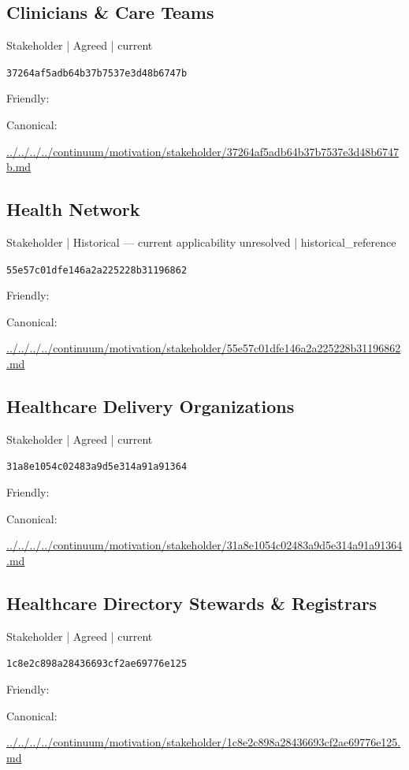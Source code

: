 \documentclass[10pt,a4paper]{article}
\begin{document}
\subsection*{Clinicians \& Care Teams}
{\small Stakeholder | Agreed | current}\par
\texttt{37264af5adb64b37b7537e3d48b6747b}\par
Friendly: \par
Canonical: \par
{\footnotesize\url{../../../../continuum/motivation/stakeholder/37264af5adb64b37b7537e3d48b6747b.md}}\par
\subsection*{Health Network}
{\small Stakeholder | Historical — current applicability unresolved | historical\_reference}\par
\texttt{55e57c01dfe146a2a225228b31196862}\par
Friendly: \par
Canonical: \par
{\footnotesize\url{../../../../continuum/motivation/stakeholder/55e57c01dfe146a2a225228b31196862.md}}\par
\subsection*{Healthcare Delivery Organizations}
{\small Stakeholder | Agreed | current}\par
\texttt{31a8e1054c02483a9d5e314a91a91364}\par
Friendly: \par
Canonical: \par
{\footnotesize\url{../../../../continuum/motivation/stakeholder/31a8e1054c02483a9d5e314a91a91364.md}}\par
\subsection*{Healthcare Directory Stewards \& Registrars}
{\small Stakeholder | Agreed | current}\par
\texttt{1c8e2c898a28436693cf2ae69776e125}\par
Friendly: \par
Canonical: \par
{\footnotesize\url{../../../../continuum/motivation/stakeholder/1c8e2c898a28436693cf2ae69776e125.md}}\par
\end{document}
